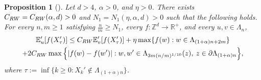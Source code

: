 \documentclass[11pt,a4paper]{article}
\numberwithin{equation}{section}
\theoremstyle{plain}
\newtheorem{Prop}[Thm]{Proposition}
\theoremstyle{definition}
\begin{document}
  
 \begin{Prop}[{\hspace{1pt}\cite[Proposition~A.7]{DumPan24Perco}}]\label{prop:uniform Harnack} Let $d>4$, $\alpha>0$, and $\eta>0$. There exists $C_{\rm RW}=C_{\rm RW}(\alpha,d)>0$ and $N_1=N_1(\eta,\alpha,d)>0$ such that the following holds. For every $n,m\geq 1$ satisfying $\tfrac{n}{m}\geq N_1$, every $f:\mathbb Z^d\rightarrow \mathbb R^+$, and every $u,v\in \Lambda_n$,
\begin{multline}
	\mathbb E_{u}'[f(X_\tau')]\leq C_{\rm RW}\mathbb E_{v}'[f(X_\tau')] +\eta\max\{f(w):w\in \Lambda_{(1+\alpha)n+2m}\}\\+2C_{\rm RW}\max\Big\{|f(w)-f(w')|: w,w'\in \Lambda_{3m(n/m)^{1/10}}(z), \: z\in \partial \Lambda_{(1+\alpha)n}\Big\},
\end{multline}
where $\tau:=\inf \{k\geq 0: X_k'\notin \Lambda_{(1+\alpha)n}\}$.
\end{Prop}
\end{document}
